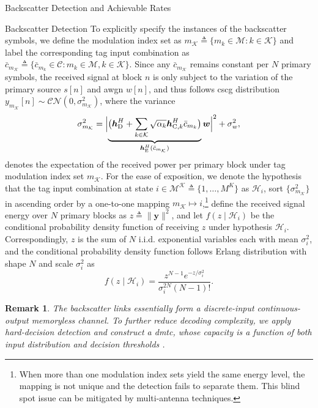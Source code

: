 \documentclass[journal]{IEEEtran}
\newtheorem{remark}{Remark}
\begin{document}
\begin{section}{Backscatter Detection and Achievable Rates}
\begin{subsection}{Backscatter Detection}
			To explicitly specify the instances of the backscatter symbols, we define the modulation index set as $m_{\mathcal{K}} \triangleq \{m_k \in \mathcal{M} : k \in \mathcal{K}\}$ and label the corresponding tag input combination as $\bar{c}_{m_{\mathcal{K}}} \triangleq \{\bar{c}_{m_k} \in \mathcal{C} : m_k \in \mathcal{M}, k \in \mathcal{K}\}$. Since any $\bar{c}_{m_{\mathcal{K}}}$ remains constant per $N$ primary symbols, the received signal at block $n$ is only subject to the variation of the primary source $s[n]$ and \gls{awgn} $w[n]$, and thus follows \gls{cscg} distribution $y_{m_{\mathcal{K}}}[n] \sim \mathcal{CN}\left(0,\sigma_{m_{\mathcal{K}}}^2\right)$, where the variance
			\begin{equation}
				\sigma_{m_{\mathcal{K}}}^2 = \Bigl\lvert \underbrace{\bigl(\boldsymbol{h}_{\mathrm{D}}^H + \sum_{k \in \mathcal{K}} \sqrt{\alpha_k} \boldsymbol{h}_{\mathrm{C},k}^H \bar{c}_{m_k}\bigr)}_{\boldsymbol{h}_{\mathrm{E}}^H(\bar{c}_{m_{\mathcal{K}}})} \boldsymbol{w} \Bigr\rvert^2 + \sigma_w^2,
				\label{eq:receive_variance}
			\end{equation}
			denotes the expectation of the received power per primary block under tag modulation index set $m_{\mathcal{K}}$. For the ease of exposition, we denote the hypothesis that the tag input combination at state $i \in \mathcal{M^K} \triangleq \{1,\ldots,M^K\}$ as $\mathcal{H}_i$, sort $\{\sigma_{m_{\mathcal{K}}}^2\}$ in ascending order by a one-to-one mapping $m_{\mathcal{K}} \mapsto i$,\footnote{When more than one modulation index sets yield the same energy level, the mapping is not unique and the detection fails to separate them. This blind spot issue can be mitigated by multi-antenna techniques.} define the received signal energy over $N$ primary blocks as $z \triangleq \lVert \boldsymbol{y} \rVert^2$, and let $f(z \mid \mathcal{H}_i)$ be the conditional probability density function of receiving $z$ under hypothesis $\mathcal{H}_i$. Correspondingly, $z$ is the sum of $N$ i.i.d. exponential variables each with mean $\sigma_i^2$, and the conditional probability density function follows Erlang distribution with shape $N$ and scale $\sigma_i^2$ as
			\begin{equation}
				f(z \mid \mathcal{H}_i) = \frac{z^{N-1} e^{-z/\sigma_i^2}}{\sigma_i^{2N} (N-1)!}.
				\label{eq:energy_distribution}
			\end{equation}

			\begin{remark}
				The backscatter links essentially form a discrete-input continuous-output memoryless channel. To further reduce decoding complexity, we apply hard-decision detection and construct a \gls{dmtc}, whose capacity is a function of both input distribution and decision thresholds \cite{Nguyen2018}.
			\end{remark}


\end{subsection}
\end{section}
\end{document}
